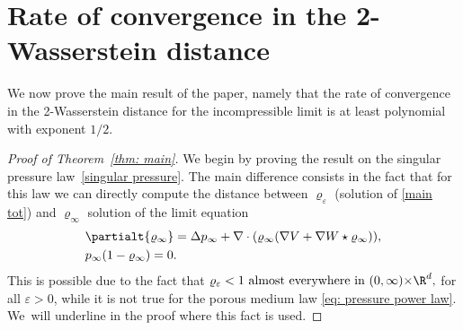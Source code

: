 \section{Rate of convergence in the 2-Wasserstein distance}\label{sec: global}

We now prove the main result of the paper, namely that the rate of convergence in the 2-Wasserstein distance for the incompressible limit is at least polynomial with exponent $1/2$.

\begin{proof}[Proof of Theorem~\ref{thm: main}]

We begin by proving the result on the singular pressure law~\eqref{singular pressure}. The main difference consists in the fact that for this law we can directly compute the distance between $\varrho_\varepsilon$ (solution of \eqref{main tot}) and $\varrho_\infty$ solution of the limit equation
\begin{equation*}
\begin{aligned}
&\partialt{\varrho_\infty} = \Delta p_\infty + \nabla \cdot(\varrho_\infty (\nabla V + \nabla W \star \varrho_\infty)),\\
&p_\infty(1-\varrho_\infty)=0.
\end{aligned}
\end{equation*}
This is possible due to the fact that $\varrho_\varepsilon<1 \text{ almost everywhere in } {(0,\infty)\times}\R^d,$ for all $\varepsilon>0$, while it is not true for the porous medium law \eqref{eq: pressure power law}. We~will underline in the proof where this fact is used.


\end{proof}
